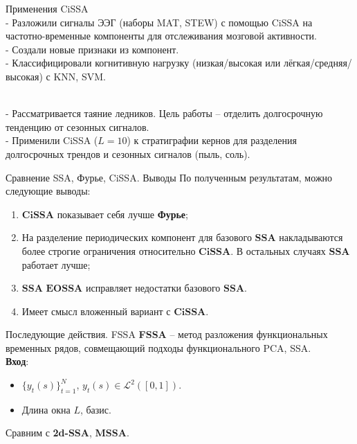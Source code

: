 \documentclass[notheorems, handout]{beamer}
\newcommand{\SSA}{\textbf{SSA}}
\newcommand{\EOSSA}{\textbf{EOSSA}}
\newcommand{\CISSA}{\textbf{CiSSA}}
\begin{document}
\begin{frame}{Применения CiSSA}
	\textbf{}\\
	- Разложили сигналы ЭЭГ (наборы MAT, STEW) с помощью CiSSA на частотно-временные компоненты для отслеживания мозговой активности. \\
	- Создали новые признаки из компонент. \\
	- Классифицировали когнитивную нагрузку (низкая/высокая или лёгкая/средняя/высокая) с KNN, SVM.


	\textbf{} \\
	- Рассматривается таяние ледников. Цель работы -- отделить долгосрочную тенденцию от сезонных сигналов. \\
	- Применили CiSSA (\(L=10\)) к стратиграфии кернов для разделения долгосрочных трендов и сезонных сигналов (пыль, соль).\\

	\bigskip




\end{frame}

\begin{frame}{Сравнение SSA, Фурье, CiSSA. Выводы}
	По полученным результатам, можно следующие выводы:
	\begin{enumerate}
		\item $\CISSA$ показывает себя лучше \textbf{Фурье};
		\item На разделение периодических компонент для базового $\SSA$ накладываются более строгие ограничения относительно $\CISSA$. В остальных случаях $\SSA$ работает лучше;
		\item $\SSA$ $\EOSSA$ исправляет недостатки базового $\SSA$.
		\item Имеет смысл вложенный вариант с $\CISSA$.
	\end{enumerate}


\end{frame}


\begin{frame}{Последующие действия. FSSA}
  \textbf{FSSA} -- метод разложения функциональных временных рядов, совмещающий подходы функционального PCA, SSA. \\
  \vspace{0.2cm}
  \textbf{Вход}: \\
  \begin{itemize}
	\item \( \{y_t(s)\}_{t=1}^N \), \( y_t(s) \in \mathcal{L}^2([0,1]) \). 
	\item Длина окна \( L \), базис.
  \end{itemize}
  \vspace{0.2cm}
  
  Сравним с \textbf{2d-SSA}, \textbf{MSSA}.

\end{frame}
\end{document}

